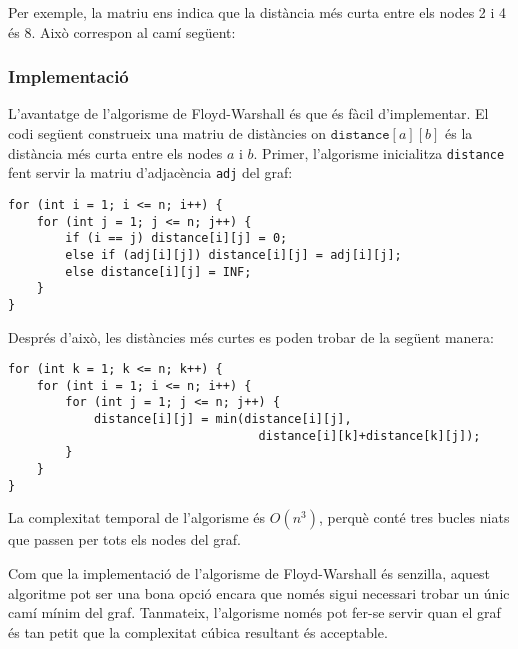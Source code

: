 Per exemple, la matriu ens indica que la distància més curta entre els
nodes 2 i 4 és 8. Això correspon al camí següent:


\begin{center}
\end{center}


\subsubsection{Implementació}

L'avantatge de l'algorisme de Floyd-Warshall és que és fàcil
d'implementar. El codi següent construeix una matriu de distàncies on
$\texttt{distance}[a][b]$ és la distància més curta entre els nodes
$a$ i $b$. Primer, l'algorisme inicialitza \texttt{distance} fent
servir la matriu d'adjacència \texttt{adj} del graf:


\begin{lstlisting}
for (int i = 1; i <= n; i++) {
    for (int j = 1; j <= n; j++) {
        if (i == j) distance[i][j] = 0;
        else if (adj[i][j]) distance[i][j] = adj[i][j];
        else distance[i][j] = INF;
    }
}
\end{lstlisting}
Després d'això, les distàncies més curtes es poden trobar de la següent manera:
\begin{lstlisting}
for (int k = 1; k <= n; k++) {
    for (int i = 1; i <= n; i++) {
        for (int j = 1; j <= n; j++) {
            distance[i][j] = min(distance[i][j],
                                   distance[i][k]+distance[k][j]);
        }
    }
}
\end{lstlisting}


La complexitat temporal de l'algorisme és $O(n^3)$, perquè conté tres
bucles niats que passen per tots els nodes del graf.

Com que la implementació de l'algorisme de Floyd-Warshall és senzilla,
aquest algoritme pot ser una bona opció encara que només sigui
necessari trobar un únic camí mínim del graf. Tanmateix, l'algorisme
només pot fer-se servir quan el graf és tan petit que la complexitat
cúbica resultant és acceptable.



